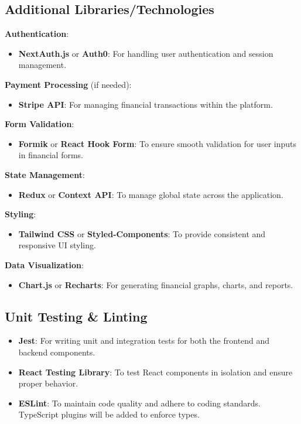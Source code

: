 \documentclass{article}
\begin{document}
\subsection{Additional Libraries/Technologies}
\textbf{Authentication}:
\begin{itemize}
  \item \textbf{NextAuth.js} or \textbf{Auth0}: For handling user authentication and session management.
\end{itemize}

\textbf{Payment Processing} (if needed):
\begin{itemize}
  \item \textbf{Stripe API}: For managing financial transactions within the platform.
\end{itemize}

\textbf{Form Validation}:
\begin{itemize}
  \item \textbf{Formik} or \textbf{React Hook Form}: To ensure smooth validation for user inputs in financial forms.
\end{itemize}

\textbf{State Management}:
\begin{itemize}
  \item \textbf{Redux} or \textbf{Context API}: To manage global state across the application.
\end{itemize}

\textbf{Styling}:
\begin{itemize}
  \item \textbf{Tailwind CSS} or \textbf{Styled-Components}: To provide consistent and responsive UI styling.
\end{itemize}

\textbf{Data Visualization}:
\begin{itemize}
  \item \textbf{Chart.js} or \textbf{Recharts}: For generating financial graphs, charts, and reports.
\end{itemize}

\subsection{Unit Testing \& Linting}
\begin{itemize}
  \item \textbf{Jest}: For writing unit and integration tests for both the frontend and backend components.
  \item \textbf{React Testing Library}: To test React components in isolation and ensure proper behavior.
  \item \textbf{ESLint}: To maintain code quality and adhere to coding standards. TypeScript plugins will be added to enforce types.
\end{itemize}
\end{document}
